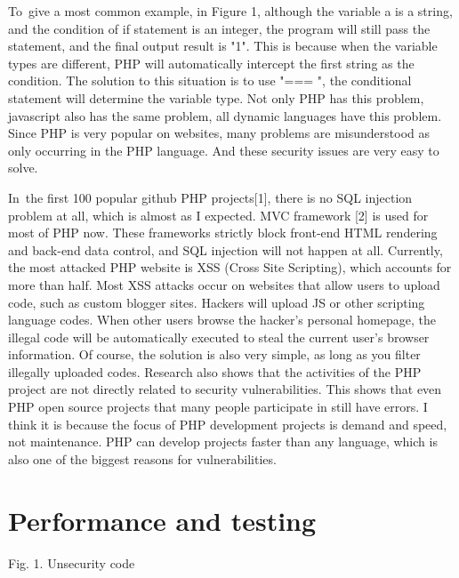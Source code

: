 \documentclass[12pt]{report}
\renewcommand{\_}{\kern-1.5pt\textunderscore\kern-1.5pt}
\begin{document}
\begin{multicols}{2}
\vspace{\baselineskip}\begin{justify}
{\fontsize{10pt}{12.0pt}\selectfont To\ give a most common example, in Figure 1, although the variable a is a string, and the condition of if statement is an integer, the program will still pass the statement, and the final output result is "1". This is because when the variable types are different, PHP will automatically intercept the first string as the condition. The solution to this situation is to use "=== ", the conditional statement will determine the variable type.  Not only PHP has this problem, javascript also has the same problem, all dynamic languages have this problem. Since PHP is very popular on websites, many problems are misunderstood as only occurring in the PHP language. And these security issues are very easy to solve. \par}
\end{justify}
\begin{justify}
{\fontsize{10pt}{12.0pt}\selectfont In\ the first 100 popular github PHP projects[1], there is no SQL injection problem at all, which is almost as I expected. MVC framework [2] is used for most of PHP now. These frameworks strictly block front-end HTML rendering and back-end data control, and SQL injection will not happen at all. Currently, the most attacked PHP website is XSS (Cross Site Scripting), which accounts for more than half. Most XSS attacks occur on websites that allow users to upload code, such as custom blogger sites.  Hackers will upload JS or other scripting language codes. When other users browse the hacker's personal homepage, the illegal code will be automatically executed to steal the current user's browser information. Of course, the solution is also very simple, as long as you filter illegally uploaded codes. Research also shows that the activities of the PHP project are not directly related to security vulnerabilities. This shows that even PHP open source projects that many people participate in still have errors. I think it is because the focus of PHP development projects is demand and speed, not maintenance. PHP can develop projects faster than any language, which is also one of the biggest reasons for vulnerabilities.\par}
\end{justify}

\vspace{\baselineskip}\setlength{\parskip}{3.96pt}
\section{Performance and testing\hspace*{10pt}}
\begin{Center}
{\fontsize{8pt}{9.6pt}\selectfont Fig. 1. Unsecurity code}
\end{Center}


\end{multicols}
\end{document}

